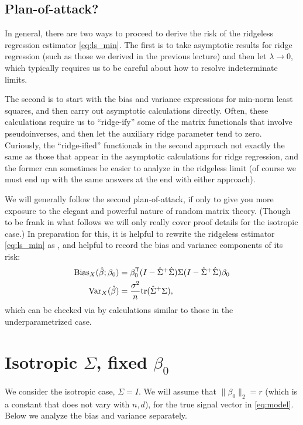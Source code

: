 \documentclass{article}
\begin{document}
\subsection{Plan-of-attack?}

In general, there are two ways to proceed to derive the risk of the ridgeless
regression estimator \eqref{eq:ls_min}. The first is to take asymptotic results
for ridge regression (such as those we derived in the previous lecture) and then
let $\lambda \to 0$, which typically requires us to be careful about how to
resolve indeterminate limits. 

The second is to start with the bias and variance expressions for min-norm 
least squares, and then carry out asymptotic calculations directly. Often, these
calculations require us to ``ridge-ify'' some of the matrix functionals
that involve pseudoinverses, and then let the auxiliary ridge parameter tend to
zero. Curiously, the ``ridge-ified'' functionals in the second approach not
exactly the same as those that appear in the asymptotic calculations for ridge 
regression, and the former can sometimes be easier to analyze in the ridgeless
limit (of course we must end up with the same answers at the end with either
approach).  

We will generally follow the second plan-of-attack, if only to give you more
exposure to the elegant and powerful nature of random matrix theory. (Though to
be frank in what follows we will only really cover proof details for the
isotropic case.) In preparation for this, it is helpful to rewrite the ridgeless
estimator  \eqref{eq:ls_min} as , and
helpful to record the bias and variance components of its risk:  
\begin{align}
\label{eq:ls_min_bias}
\mathrm{Bias}_X(\hat{\beta}; \beta_0) &= \beta_0^{\mathsf{T}} (I - \hat\Sigma^+ \hat\Sigma) \Sigma 
  (I - \hat\Sigma^+ \hat\Sigma) \beta_0 \\  
\label{eq:ls_min_var}
\mathrm{Var}_X(\hat{\beta}) &= \frac{\sigma^2}{n} \mathrm{tr} (\hat\Sigma^+ \Sigma),
\end{align}
which can be checked via by calculations similar to those in the underparametrized case.    

\section{Isotropic $\Sigma$, fixed $\beta_0$}

We consider the isotropic case, $\Sigma = I$.  We will assume that $\|\beta_0\|_2
= r$ (which is a constant that does not vary with $n,d$), for the true signal
vector in \eqref{eq:model}. Below we analyze the bias and variance separately.
\end{document}
